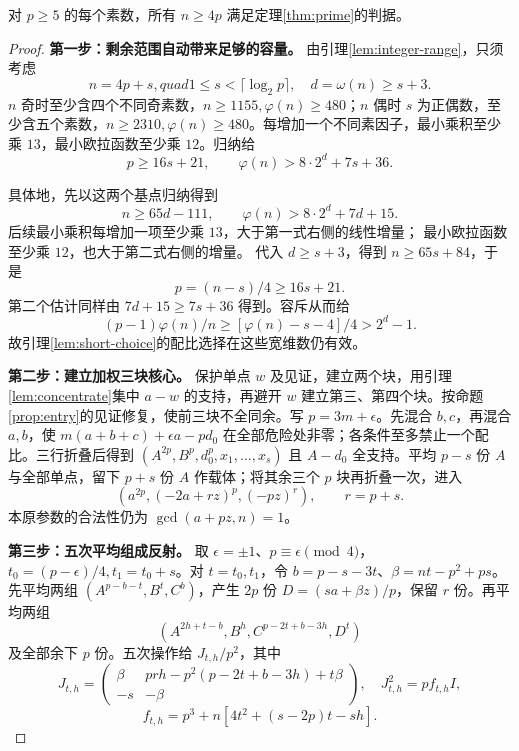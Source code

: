 \begin{proposition}\label{prop:wide}
对 $p\ge5$ 的每个素数，所有 $n\ge4p$ 满足定理\ref{thm:prime}的判据。
\end{proposition}
\begin{proof}

\par\noindent\textbf{第一步：剩余范围自动带来足够的容量。}
由引理\ref{lem:integer-range}，只须考虑
\begin{equation}\label{eq:tail-range}
n=4p+s,quad1\le s<\lceil\log_2p\rceil,\quad d=\omega(n)\ge s+3.
\end{equation}
$n$ 奇时至少含四个不同奇素数，$n\ge1155,\varphi(n)\ge480$；$n$ 偶时 $s$ 为正偶数，至少含五个素数，$n\ge2310,\varphi(n)\ge480$。每增加一个不同素因子，最小乘积至少乘 $13$，最小欧拉函数至少乘 $12$。归纳给
\begin{equation}\label{eq:tail-estimates}
p\ge16s+21,\qquad \varphi(n)>8\cdot2^d+7s+36.
\end{equation}

具体地，先以这两个基点归纳得到
\[
n\ge65d-111,\qquad \varphi(n)>8\cdot2^d+7d+15.
\]
后续最小乘积每增加一项至少乘 $13$，大于第一式右侧的线性增量；
最小欧拉函数至少乘 $12$，也大于第二式右侧的增量。
代入 $d\ge s+3$，得到 $n\ge65s+84$，于是
\[
p=(n-s)/4\ge16s+21.
\]
第二个估计同样由 $7d+15\ge7s+36$ 得到。容斥从而给
\[(p-1)\varphi(n)/n\ge[\varphi(n)-s-4]/4>2^d-1.
\]
故引理\ref{lem:short-choice}的配比选择在这些宽维数仍有效。


\par\noindent\textbf{第二步：建立加权三块核心。}
保护单点 $w$ 及见证，建立两个块，用引理\ref{lem:concentrate}集中 $a-w$ 的支持，再避开 $w$ 建立第三、第四个块。按命题\ref{prop:entry}的见证修复，使前三块不全同余。写 $p=3m+\epsilon$。先混合 $b,c$，再混合 $a,b$，使 $m(a+b+c)+\epsilon a-pd_0$ 在全部危险处非零；各条件至多禁止一个配比。三行折叠后得到 $(A^{2p},B^p,d_0^p,x_1,\ldots,x_s)$ 且 $A-d_0$ 全支持。平均 $p-s$ 份 $A$ 与全部单点，留下 $p+s$ 份 $A$ 作载体；将其余三个 $p$ 块再折叠一次，进入
\begin{equation}\label{eq:wide-core}
(a^{2p},(-2a+rz)^p,(-pz)^r),\qquad r=p+s.
\end{equation}
本原参数的合法性仍为 $\gcd(a+pz,n)=1$。


\par\noindent\textbf{第三步：五次平均组成反射。}
取 $\epsilon=\pm1$、$p\equiv\epsilon\pmod4$，$t_0=(p-\epsilon)/4,t_1=t_0+s$。对 $t=t_0,t_1$，令 $b=p-s-3t$、$\beta=nt-p^2+ps$。先平均两组 $(A^{p-b-t},B^t,C^b)$，产生 $2p$ 份 $D=(sa+\beta z)/p$，保留 $r$ 份。再平均两组
\[
(A^{2h+t-b},B^h,C^{p-2t+b-3h},D^t)
\]
及全部余下 $p$ 份。五次操作给 $J_{t,h}/p^2$，其中
\begin{equation}\label{eq:tail-J}
J_{t,h}=\begin{pmatrix}\beta&prh-p^2(p-2t+b-3h)+t\beta\\-s&-\beta\end{pmatrix},
\quad J_{t,h}^2=pf_{t,h}I,
\end{equation}
\[
f_{t,h}=p^3+n[4t^2+(s-2p)t-sh].
\]


\end{proof}
